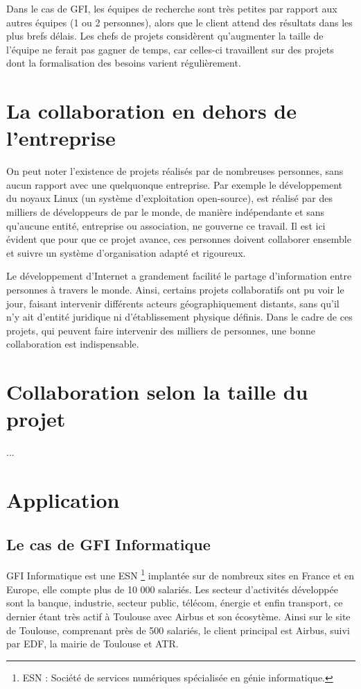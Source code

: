 \begin{app}
Dans le cas de GFI, les équipes de recherche sont très petites par rapport aux autres équipes (1 ou 2 personnes), alors que le client attend des résultats dans les plus brefs délais. Les chefs de projets considèrent qu'augmenter la taille de l'équipe ne ferait pas gagner de temps, car celles-ci travaillent sur des projets dont la formalisation des besoins varient régulièrement.
\end{app}

\section{La collaboration en dehors de l'entreprise}

On peut noter l'existence de projets réalisés par de nombreuses personnes, sans aucun rapport avec une quelquonque entreprise. Par exemple le développement du noyaux Linux (un système d'exploitation open-source), est réalisé par des milliers de développeurs de par le monde, de manière indépendante et sans qu'aucune entité, entreprise ou  association, ne gouverne ce travail. Il est ici évident que pour que ce projet avance, ces personnes doivent collaborer ensemble et suivre un système d'organisation adapté et rigoureux.

Le développement d'Internet a grandement facilité le partage d'information entre personnes à travers le monde. Ainsi, certains projets collaboratifs ont pu voir le jour, faisant intervenir différents acteurs géographiquement distants, sans qu'il n'y ait d'entité juridique ni d'établissement physique définis. Dans le cadre de ces projets, qui peuvent faire intervenir des milliers de personnes, une bonne collaboration est indispensable.

\section{Collaboration selon la taille du projet}

...

\section{Application}

\subsection{Le cas de GFI Informatique}

GFI Informatique est une \gls{ESN} \footnote{ESN : Société de services numériques spécialisée en génie informatique.} implantée sur de nombreux sites en France et en Europe, elle compte plus de 10 000 salariés. Les secteur d'activités développée sont la banque, industrie, secteur public, télécom, énergie et enfin transport, ce dernier étant très actif à Toulouse avec Airbus et son écosytème. Ainsi sur le site de Toulouse, comprenant près de 500 salariés, le client principal est Airbus, suivi par EDF, la mairie de Toulouse et ATR.

